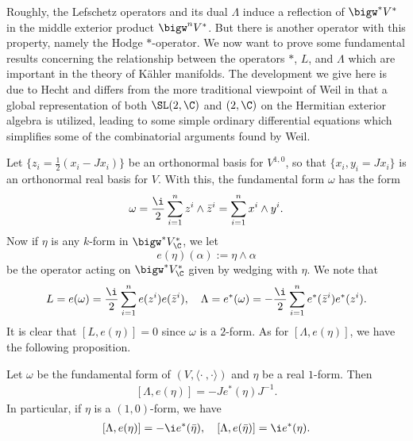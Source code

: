 Roughly, the Lefschetz operators and its dual $\Lambda$ induce a reflection of $\bigw^*V^*$ in the middle exterior product $\bigw^nV^*$. But there is another operator with this property, namely the Hodge $\ast$-operator. We now want to prove some fundamental results concerning the relationship between the operators $\ast$, $L$, and $\Lambda$ which are important in the theory of K\"ahler manifolds. The development we give here is due to Hecht and differs from the more traditional viewpoint of Weil in that a global representation of both $\SL(2,\C)$ and $\sl(2,\C)$ on the Hermitian exterior algebra is utilized, leading to some simple ordinary differential equations which simplifies some of the combinatorial arguments found by Weil.\par
Let $\{z_i=\frac{1}{2}(x_i-Jx_i)\}$ be an orthonormal basis for $V^{1,0}$, so that $\{x_i,y_i=Jx_i\}$ is an orthonormal real basis for $V$. With this, the fundamental form $\omega$ has the form
\[\omega=\frac{\i}{2}\sum_{i=1}^{n}z^i\wedge\bar{z}^i=\sum_{i=1}^{n}x^i\wedge y^i.\]
Now if $\eta$ is any $k$-form in $\bigw^*V^*_{\C}$, we let
\[e(\eta)(\alpha):=\eta\wedge\alpha\]
be the operator acting on $\bigw^*V^*_{\C}$ given by wedging with $\eta$. We note that
\begin{align}\label{almost complex space interoir prod into L,Lambda}
L=e(\omega)=\frac{\i}{2}\sum_{i=1}^{n}e(z^i)e(\bar{z}^i),\quad \Lambda=e^*(\omega)=-\frac{\i}{2}\sum_{i=1}^{n}e^*(\bar{z}^i)e^*(z^i).
\end{align}
It is clear that $[L,e(\eta)]=0$ since $\omega$ is a $2$-form. As for $[\Lambda,e(\eta)]$, we have the following proposition.
\begin{proposition}\label{almost complex space interoir prod commutator with L,Lambda}
Let $\omega$ be the fundamental form of $(V,\langle\cdot\ ,\cdot\rangle)$ and $\eta$ be a real $1$-form. Then
\begin{align}\label{almost complex space interoir prod commutator with L,Lambda-2}
[\Lambda,e(\eta)]=-Je^*(\eta)J^{-1}.
\end{align}
In particular, if $\eta$ is a $(1,0)$-form, we have
\begin{align}\label{almost complex space interoir prod commutator with L,Lambda-1}
[\Lambda,e(\eta)]=-\i e^*(\bar{\eta}),\quad [\Lambda,e(\bar{\eta})]=\i e^*(\eta).
\end{align}
\end{proposition}
